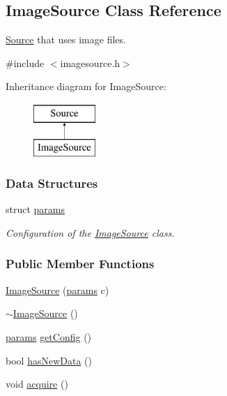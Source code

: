 \hypertarget{classImageSource}{\subsection{\-Image\-Source \-Class \-Reference}
\label{classImageSource}
}


\hyperlink{classSource}{\-Source} that uses image files.  




{\ttfamily \#include $<$imagesource.\-h$>$}

\-Inheritance diagram for \-Image\-Source\-:\begin{figure}[H]
\begin{center}
\leavevmode
\includegraphics[height=2.000000cm]{classImageSource}
\end{center}
\end{figure}
\subsubsection*{\-Data \-Structures}
\begin{DoxyCompactItemize}
\item 
struct \hyperlink{structImageSource_1_1params}{params}
\begin{DoxyCompactList}\small\item\em \-Configuration of the \hyperlink{classImageSource}{\-Image\-Source} class. \end{DoxyCompactList}\end{DoxyCompactItemize}
\subsubsection*{\-Public \-Member \-Functions}
\begin{DoxyCompactItemize}
\item 
\hyperlink{classImageSource_a086ebf6a4094dc52b65b991b147b6c4d}{\-Image\-Source} (\hyperlink{structImageSource_1_1params}{params} c)
\item 
\hyperlink{classImageSource_a6b2d501403e70bb460ac337e68ee16d7}{$\sim$\-Image\-Source} ()
\item 
\hyperlink{structImageSource_1_1params}{params} \hyperlink{classImageSource_a7cc846a2611cc5a90296782d922041e8}{get\-Config} ()
\item 
bool \hyperlink{classImageSource_ab65bd864ba3c7961479ec2ad3b1ff163}{has\-New\-Data} ()
\item 
void \hyperlink{classImageSource_ad969a45dd3dbda08b9a73f50ada50dfb}{acquire} ()
\end{DoxyCompactItemize}
